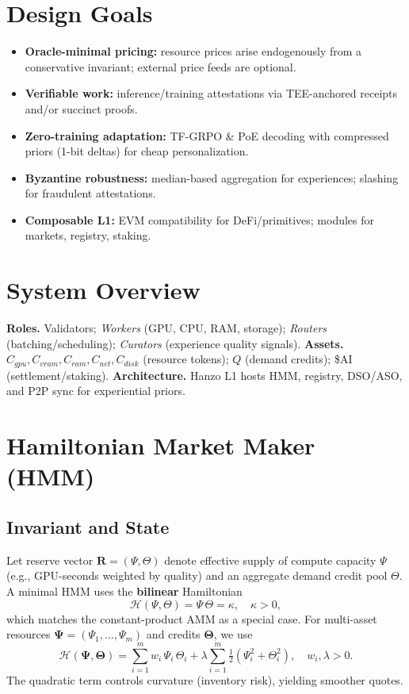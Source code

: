 \documentclass[11pt]{article}
\begin{document}
\section{Design Goals}
\begin{itemize}[leftmargin=1.1em]
  \item \textbf{Oracle-minimal pricing:} resource prices arise endogenously from a conservative invariant; external price feeds are optional.
  \item \textbf{Verifiable work:} inference/training attestations via TEE-anchored receipts and/or succinct proofs.
  \item \textbf{Zero-training adaptation:} TF-GRPO \& PoE decoding with compressed priors (1-bit deltas) for cheap personalization.
  \item \textbf{Byzantine robustness:} median-based aggregation for experiences; slashing for fraudulent attestations.
  \item \textbf{Composable L1:} EVM compatibility for DeFi/primitives; modules for markets, registry, staking.
\end{itemize}

\section{System Overview}
\textbf{Roles.} Validators; \emph{Workers} (GPU, CPU, RAM, storage); \emph{Routers} (batching/scheduling); \emph{Curators} (experience quality signals). \textbf{Assets.} \(C_{gpu}, C_{vram}, C_{ram}, C_{net}, C_{disk}\) (resource tokens); \(Q\) (demand credits); \$AI (settlement/staking). \textbf{Architecture.} Hanzo L1 hosts HMM, registry, DSO/ASO, and P2P sync for experiential priors.

\section{Hamiltonian Market Maker (HMM)}
\subsection{Invariant and State}
Let reserve vector \(\bm R = (\Psi, \Theta)\) denote effective supply of compute capacity \(\Psi\) (e.g., GPU-seconds weighted by quality) and an aggregate demand credit pool \(\Theta\). A minimal HMM uses the \textbf{bilinear} Hamiltonian
\begin{equation}\label{eq:cpmm}
\mathcal H(\Psi,\Theta) = \Psi\,\Theta = \kappa, \quad \kappa>0,
\end{equation}
which matches the constant-product AMM as a special case. For multi-asset resources \(\bm \Psi=(\Psi_1,\dots,\Psi_m)\) and credits \(\bm \Theta\), we use
\begin{equation}
\mathcal H(\bm\Psi,\bm\Theta) = \sum_{i=1}^m w_i\,\Psi_i\,\Theta_i + \lambda \sum_{i=1}^m \tfrac{1}{2}(\Psi_i^2+\Theta_i^2), \quad w_i,\lambda>0.
\end{equation}
The quadratic term controls curvature (inventory risk), yielding smoother quotes.
\end{document}
